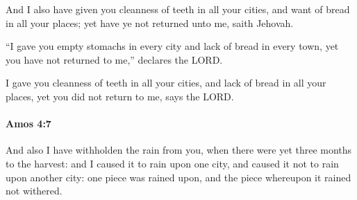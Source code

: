 			\begin{versebox}
					\item[BHS] 
					\item[LXX] 
					\item[ASV] And I also have given you cleanness of teeth in all your cities, and want of bread in all your places; yet have ye not returned unto me, saith Jehovah.
					\item[NIV] “I gave you empty stomachs in every city and lack of bread in every town, yet you have not returned to me,” declares the LORD.
					\item[NRSV] I gave you cleanness of teeth in all your cities, and lack of bread in all your places, yet you did not return to me, says the LORD.
			\end{versebox}

		\paragraph{Amos 4:7} %
			\label{AMOS-4-7}

			And also I have withholden the rain from you, when there were yet three months to the harvest: and I caused it to rain upon one city, and caused it not to rain upon another city: one piece was rained upon, and the piece whereupon it rained not withered.

